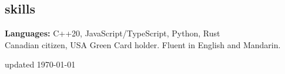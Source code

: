 \documentclass[margin,10pt]{res}
\begin{document}
\begin{resume}
\section{\sc \lsstyle skills}
    \textbf{Languages:}
    C++20, JavaScript/TypeScript, Python, Rust \\
    Canadian citizen, USA Green Card holder. Fluent in English and Mandarin.\\
\end{resume}
\begin{minipage}[t]{\textwidth}
    \flushright
    \small
    \sc \lsstyle
    \hfill updated \today
\end{minipage}
\end{document}
